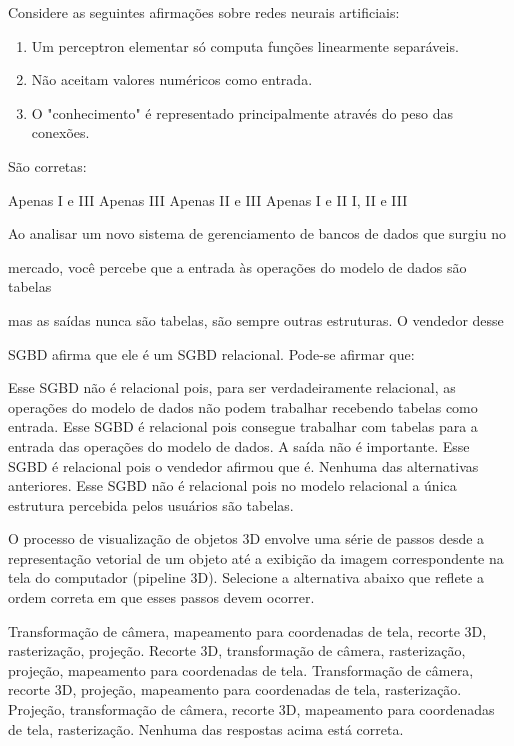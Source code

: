 \documentclass[12pt, addpoints]{exam}
\begin{document}
\begin{questions}
\question

Considere as seguintes afirmações sobre redes neurais artificiais: \begin{enumerate}[label=\Roman*.] \item Um perceptron elementar só computa funções linearmente separáveis. \item Não aceitam valores numéricos como entrada. \item O "conhecimento" é representado principalmente através do peso das conexões. \end{enumerate} São corretas:
\begin{choices}
\choice Apenas I e III
\choice Apenas III
\choice Apenas II e III
\choice Apenas I e II 
\choice I, II e III
\end{choices}

\question

Ao analisar um novo sistema de gerenciamento de bancos de dados que surgiu no

mercado, você percebe que a entrada às operações do modelo de dados são tabelas

mas as saídas nunca são tabelas, são sempre outras estruturas. O vendedor desse

SGBD afirma que ele é um SGBD relacional. Pode-se afirmar que:


\begin{choices}
\choice Esse SGBD não é relacional pois, para ser verdadeiramente relacional, as operações do modelo de dados não podem trabalhar recebendo tabelas como entrada.
\choice Esse SGBD é relacional pois consegue trabalhar com tabelas para a entrada das operações do modelo de dados. A saída não é importante.
\choice Esse SGBD é relacional pois o vendedor afirmou que é.
\choice Nenhuma das alternativas anteriores.
\choice Esse SGBD não é relacional pois no modelo relacional a única estrutura percebida pelos usuários são tabelas.
\end{choices}

\question

O processo de visualização de objetos 3D envolve uma série de passos desde a representação vetorial de um objeto até a exibição da imagem correspondente na tela do computador (pipeline 3D). Selecione a alternativa abaixo que reflete a ordem correta em que esses passos devem ocorrer. 
\begin{choices}
\choice Transformação de câmera, mapeamento para coordenadas de tela, recorte 3D, rasterização, projeção. 
\choice Recorte 3D, transformação de câmera, rasterização, projeção, mapeamento para coordenadas de tela. 
\choice Transformação de câmera, recorte 3D, projeção, mapeamento para coordenadas de tela, rasterização. 
\choice Projeção, transformação de câmera, recorte 3D, mapeamento para coordenadas de tela, rasterização. 
\choice Nenhuma das respostas acima está correta.
\end{choices}


\end{questions}
\end{document}

